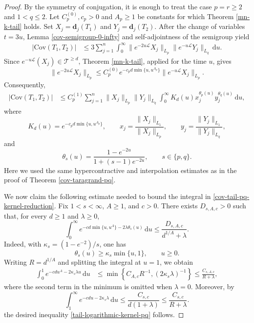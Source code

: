 \documentclass{amsbook}
\theoremstyle{definition}
\theoremstyle{remark}
\numberwithin{section}{chapter}
\numberwithin{equation}{chapter}
\newcommand{\1}{\mathbf{1}}
\newcommand{\dc}{\mathbf{d}}
\begin{document}
\begin{proof}
By the symmetry of conjugation, it is enough to treat the case $p=r\geq2$ and $1<q\leq2$.  Let $C_{p}^{(0)},c_{p}>0$ and $A_{p}\geq1$ be constants for
which Theorem \ref{mn-k-tail} holds.  Set
$X_{j}=\dc_{j}(T_{1})$ and $Y_{j}=\dc_{j}(T_{2})$.  After the change of
variables $t=3u$, Lemma \ref{cov-semigroup-0-infty} and self-adjointness of the
semigroup yield
\begin{align*}
\big|\mathrm{Cov}(T_{1},T_{2})\big|
&\leq3\sum_{j=1}^{n}\int_{0}^{\infty}
 \|e^{-2u\mathcal{L}}X_{j}\|_{L_{p}}
 \|e^{-u\mathcal{L}}Y_{j}\|_{L_{q}}\,\mathrm{d}u.
\end{align*}
Since $e^{-u\mathcal{L}}(X_{j})\in\mathcal{T}^{\geq d}$, Theorem
\ref{mn-k-tail}, applied for the time $u$, gives
\[
\|e^{-2u\mathcal{L}}X_{j}\|_{L_{p}}
\leq C_{p}^{(0)}
 e^{-c_{p}d\min\{u,u^{A_{p}}\}}
 \|e^{-u\mathcal{L}}X_{j}\|_{L_{p}}.
\]
Consequently,
\begin{align}\label{cov-tail-pq-kernel-reduction}
\big|\mathrm{Cov}(T_{1},T_{2})\big|
&\leq C_{p}^{(1)}\sum_{j=1}^{n}
 \|X_{j}\|_{L_{p}}\|Y_{j}\|_{L_{q}}
 \int_{0}^{\infty}K_{d}(u)
 x_{j}^{\theta_{p}(u)}y_{j}^{\theta_{q}(u)}\,\mathrm{d}u,
\end{align}
where
\[
K_{d}(u)=e^{-c_{p}d\min\{u,u^{A_{p}}\}},
\qquad
x_{j}=\frac{\|X_{j}\|_{L_{1}}}{\|X_{j}\|_{L_{p}}},
\qquad
y_{j}=\frac{\|Y_{j}\|_{L_{1}}}{\|Y_{j}\|_{L_{q}}},
\]
and
\[
\theta_{s}(u)=\frac{1-e^{-2u}}{1+(s-1)e^{-2u}},
\qquad s\in\{p,q\}.
\]
Here we used the same hypercontractive and interpolation estimates as in the
proof of Theorem \ref{cov-taragrand-pq}.

We now claim the following estimate needed to bound the integral in
\eqref{cov-tail-pq-kernel-reduction}.  Fix $1<s<\infty$, $A\geq1$, and
$c>0$.  There exists $D_{s,A,c}>0$ such that, for every $d\geq1$ and
$\lambda\geq0$,
\begin{equation}\label{tail-logarithmic-kernel-pq}
\int_{0}^{\infty}
 e^{-cd\min\{u,u^{A}\}-2\lambda\theta_{s}(u)}\,\mathrm{d}u
\leq\frac{D_{s,A,c}}{d^{1/A}+\lambda}.
\end{equation}
Indeed, with $\kappa_{s}=(1-e^{-2})/s$, one has
\[
\theta_{s}(u)\geq\kappa_{s}\min\{u,1\},
\qquad u\geq0.
\]
Writing $R=d^{1/A}$ and splitting the integral at $u=1$, we obtain
\begin{align*}
\int_{0}^{1}e^{-cdu^{A}-2\kappa_{s}\lambda u}\,\mathrm{d}u
&\leq\min\left\{C_{A,c}R^{-1},(2\kappa_{s}\lambda)^{-1}\right\}
 \leq\frac{C_{s,A,c}}{R+\lambda},
\end{align*}
where the second term in the minimum is omitted when $\lambda=0$.
Moreover, by
\[
\int_{1}^{\infty}e^{-cdu-2\kappa_{s}\lambda}\,\mathrm{d}u \leq\frac{C_{s,c}}{d(1+\lambda)} \leq\frac{C_{s,c}}{R+\lambda}.
\]
the desired inequality \eqref{tail-logarithmic-kernel-pq} follows.


\end{proof}
\end{document}
